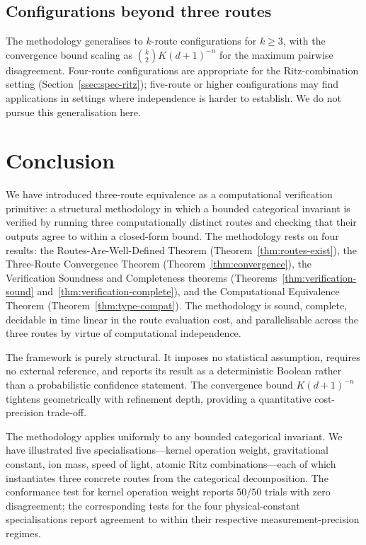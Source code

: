 \documentclass[twocolumn,11pt,a4paper]{article}
\newcommand{\Depth}{n}
\newcommand{\Dim}{d}
\newcommand{\Tolb}{K}
\begin{document}
\subsection{Configurations beyond three routes}

The methodology generalises to $k$-route configurations for $k \geq 3$, with the convergence bound scaling as $\binom{k}{2}\Tolb(\Dim+1)^{-\Depth}$ for the maximum pairwise disagreement. Four-route configurations are appropriate for the Ritz-combination setting (Section~\ref{ssec:spec-ritz}); five-route or higher configurations may find applications in settings where independence is harder to establish. We do not pursue this generalisation here.

\section{Conclusion}
\label{sec:conclusion}

We have introduced three-route equivalence as a computational verification primitive: a structural methodology in which a bounded categorical invariant is verified by running three computationally distinct routes and checking that their outputs agree to within a closed-form bound. The methodology rests on four results: the Routes-Are-Well-Defined Theorem (Theorem~\ref{thm:routes-exist}), the Three-Route Convergence Theorem (Theorem~\ref{thm:convergence}), the Verification Soundness and Completeness theorems (Theorems~\ref{thm:verification-sound} and~\ref{thm:verification-complete}), and the Computational Equivalence Theorem (Theorem~\ref{thm:type-compat}). The methodology is sound, complete, decidable in time linear in the route evaluation cost, and parallelisable across the three routes by virtue of computational independence.

The framework is purely structural. It imposes no statistical assumption, requires no external reference, and reports its result as a deterministic Boolean rather than a probabilistic confidence statement. The convergence bound $\Tolb(\Dim+1)^{-\Depth}$ tightens geometrically with refinement depth, providing a quantitative cost-precision trade-off.

The methodology applies uniformly to any bounded categorical invariant. We have illustrated five specialisations---kernel operation weight, gravitational constant, ion mass, speed of light, atomic Ritz combinations---each of which instantiates three concrete routes from the categorical decomposition. The conformance test for kernel operation weight reports $50/50$ trials with zero disagreement; the corresponding tests for the four physical-constant specialisations report agreement to within their respective measurement-precision regimes.
\end{document}
